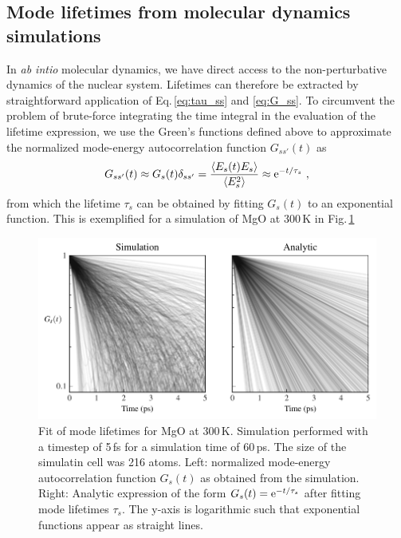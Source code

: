 \subsection{Mode lifetimes from molecular dynamics simulations}
In \emph{ab intio} molecular dynamics, we have direct access to the non-perturbative dynamics of the nuclear system. Lifetimes can therefore be extracted by straightforward application of Eq.\,\eqref{eq:tau_ss} and \eqref{eq:G_ss}. To circumvent the problem of brute-force integrating the time integral in the evaluation of the lifetime expression, we use the Green's functions defined above to approximate the normalized mode-energy autocorrelation function $G_{ss'} (t)$ as
\begin{align}
	G_{ss'} (t) \approx G_s (t) \delta_{ss'} = \frac{\braket{E_s (t) E_s}}{\braket{E^2_s}}
		\approx  {\rm e}^{-t / \tau_s}~,
	\label{eq:G_s}
\end{align}
%
%
from which the lifetime $\tau_s$ can be obtained by fitting $G_s (t)$ to an exponential function. This is exemplified for a simulation of MgO at 300\,K in Fig.\,\ref{fig:G_s}
\begin{figure}
	\includegraphics[width=\textwidth]{./data/plots/lifetimes/greenkubo_summary_interpolation_lifetimes.pdf}
	\caption{Fit of mode lifetimes for MgO at 300\,K. Simulation performed with a timestep of 5\,fs for a simulation time of 60\,ps. The size of the simulatin cell was 216 atoms. Left: normalized mode-energy autocorrelation function $G_s (t)$ as obtained from the simulation. Right: Analytic expression of the form $G_s (t) = {\rm e}^{-t / \tau_s}$ after fitting mode lifetimes $\tau_s$. The y-axis is logarithmic such that exponential functions appear as straight lines.}
	\label{fig:G_s}
\end{figure}

